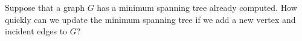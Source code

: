 Suppose that a graph $G$ has a minimum spanning tree already computed. 
How quickly can we update the minimum spanning tree if we add a new 
vertex and incident edges to $G$?